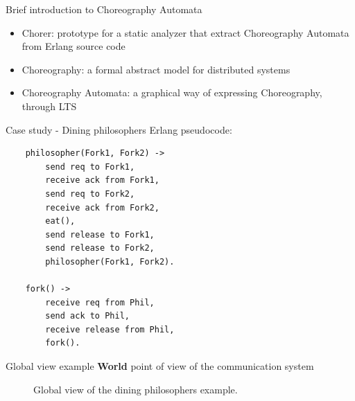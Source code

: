 \documentclass{beamer}
\begin{document}
\begin{frame}{Brief introduction to Choreography Automata}

\begin{itemize}
    \item Chorer: prototype for a static analyzer that extract Choreography 
    Automata from Erlang source code
    \bigskip
    \item Choreography: a formal abstract model for distributed systems
    \bigskip
    \item Choreography Automata: a graphical way of expressing Choreography,
    through LTS
\end{itemize}
\end{frame}

\begin{frame}[fragile]{Case study - Dining philosophers}
Erlang pseudocode:
\begin{lstlisting}
    philosopher(Fork1, Fork2) ->
        send req to Fork1,
        receive ack from Fork1,
        send req to Fork2,
        receive ack from Fork2,
        eat(),
        send release to Fork1,
        send release to Fork2,
        philosopher(Fork1, Fork2).

    fork() ->
        receive req from Phil,
        send ack to Phil,
        receive release from Phil,
        fork().
\end{lstlisting}
\end{frame}


\begin{frame}{Global view example}
\textbf{World} point of view of the communication system

\bigskip

\begin{figure}[t]
\centering
\caption{Global view of the dining philosophers example.}
\label{graph:philoglobal}
\end{figure}
\end{frame}
\end{document}
